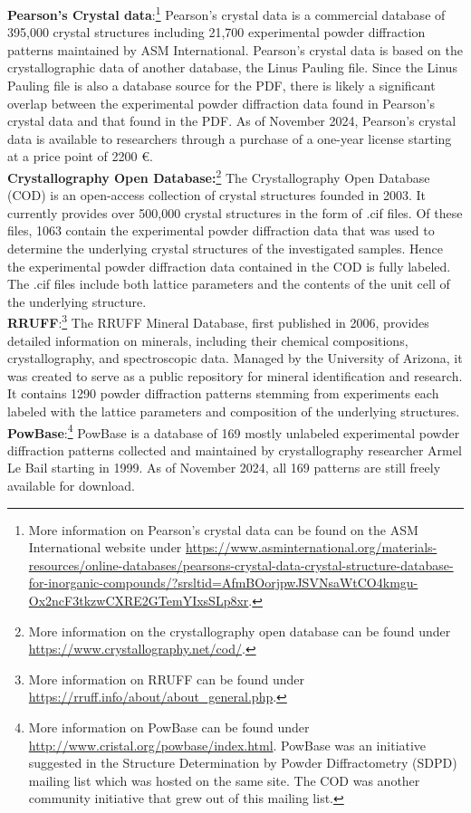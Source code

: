 \textbf{Pearson's Crystal data}:\footnote{More information on Pearson's crystal data can be found on the ASM International website under \url{https://www.asminternational.org/materials-resources/online-databases/pearsons-crystal-data-crystal-structure-database-for-inorganic-compounds/?srsltid=AfmBOorjpwJSVNsaWtCO4kmgu-Ox2ncF3tkzwCXRE2GTemYIxsSLp8xr}.} Pearson's crystal data is a commercial database of 395,000 crystal structures including 21,700 experimental powder diffraction patterns maintained by ASM International. Pearson's crystal data is based on the crystallographic data of another database, the Linus Pauling file\cite{kaduk2007}. Since the Linus Pauling file is also a database source for the PDF, there is likely a significant overlap between the experimental powder diffraction data found in Pearson's crystal data and that found in the PDF. As of November 2024, Pearson's crystal data is available to researchers through a purchase of a one-year license starting at a price point of 2200 \euro.\\

\textbf{Crystallography Open Database:}\footnote{More information on the crystallography open database can be found under \url{https://www.crystallography.net/cod/}.} The Crystallography Open Database (COD) is an open-access collection of crystal structures founded in 2003\cite{Graulis2009cod}. It currently provides over 500,000 crystal structures in the form of .cif files. Of these files, 1063 contain the experimental powder diffraction data that was used to determine the underlying crystal structures of the investigated samples. Hence the experimental powder diffraction data contained in the COD is fully labeled. The .cif files include both lattice parameters and the contents of the unit cell of the underlying structure. \\

\textbf{RRUFF}:\footnote{More information on RRUFF can be found under \url{https://rruff.info/about/about_general.php}.} The RRUFF Mineral Database, first published in 2006, provides detailed information on minerals, including their chemical compositions, crystallography, and spectroscopic data. Managed by the University of Arizona, it was created to serve as a public repository for mineral identification and research. It contains \num{1290} powder diffraction patterns stemming from experiments each labeled with the lattice parameters and composition of the underlying structures. \\

\textbf{PowBase}:\footnote{More information on PowBase can be found under \url{http://www.cristal.org/powbase/index.html}. PowBase was an initiative suggested in the Structure Determination by
Powder Diffractometry (SDPD) mailing list which was hosted on the same site. The COD was another community initiative that grew out of this mailing list.} PowBase is a database of 169 mostly unlabeled experimental powder diffraction patterns collected and maintained by crystallography researcher Armel Le Bail starting in 1999. As of November 2024, all 169 patterns are still freely available for download. \\


